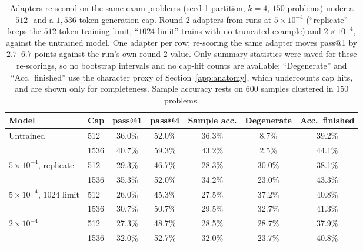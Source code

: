 \documentclass[runningheads]{llncs}
\begin{document}
\begin{table}[t]
\caption{Adapters re-scored on the same exam problems (seed-1 partition, $k=4$,
$150$ problems) under a $512$- and a $1{,}536$-token generation cap. Round-2
adapters from runs at $5\times10^{-4}$ (``replicate'' keeps the $512$-token
training limit, ``$1024$ limit'' trains with no truncated example) and
$2\times10^{-4}$, against the untrained model. One adapter per row; re-scoring
the same adapter moves pass@1 by $2.7$--$6.7$ points against the run's own
round-2 value. Only summary statistics were saved for these re-scorings, so no
bootstrap intervals and no cap-hit counts are available; ``Degenerate'' and
``Acc.\ finished'' use the character proxy of Section~\ref{app:anatomy}, which
undercounts cap hits, and are shown only for completeness. Sample accuracy
rests on $600$ samples clustered in $150$ problems.}
\label{tab:reeval}
\centering
\setlength{\tabcolsep}{3pt}
\begin{tabular}{llccccc}
\toprule
Model & Cap & pass@1 & pass@4 & Sample acc. & Degenerate & Acc.\ finished \\
\midrule
Untrained                & 512  & 36.0\% & 52.0\% & 36.3\% & 8.7\%  & 39.2\% \\
                         & 1536 & 40.7\% & 59.3\% & 43.2\% & 2.5\%  & 44.1\% \\
$5\times10^{-4}$, replicate & 512  & 29.3\% & 46.7\% & 28.3\% & 30.0\% & 38.1\% \\
                         & 1536 & 35.3\% & 52.0\% & 34.2\% & 23.0\% & 43.3\% \\
$5\times10^{-4}$, $1024$ limit & 512  & 26.0\% & 45.3\% & 27.5\% & 37.2\% & 40.8\% \\
                         & 1536 & 30.7\% & 50.7\% & 29.5\% & 32.7\% & 41.3\% \\
$2\times10^{-4}$         & 512  & 27.3\% & 48.7\% & 28.5\% & 28.7\% & 37.9\% \\
                         & 1536 & 32.0\% & 52.7\% & 32.0\% & 23.7\% & 40.8\% \\
\bottomrule
\end{tabular}
\end{table}
\end{document}
